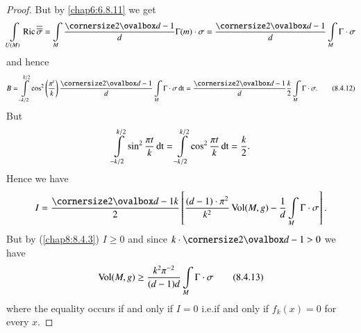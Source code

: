 \begin{proof}
But by \eqref{chap6:6.8.11} we get
$$
\int\limits_{U(M)}\Ric\oob{\sigma}=\int\limits_{M}\frac{\oval{d-1}}{d}\Gamma(m)\cdot
\sigma=\frac{\oval{d-1}}{d}\int\limits_{M}\Gamma\cdot \sigma
$$
and hence
\begin{equation*}
B=\int\limits^{k/2}_{-k/2}\cos^{2}\left(\frac{\pi^{t}}{k}\right)\frac{\oval{d-1}}{d}\int\limits_{M}\Gamma\cdot
\sigma \dt=
\frac{\oval{d-1}}{d}\frac{k}{2}\int\limits_{M}\Gamma\cdot\sigma.\tag{8.4.12}\label{chap8:8.4.12} 
\end{equation*}
But
$$
\int\limits^{k/2}_{-k/2}\sin^{2}\frac{\pi
  t}{k}\operatorname{dt}=\int\limits^{k/2}_{-k/2}\cos^{2}\frac{\pi t}{k}\operatorname{dt}=\frac{k}{2}. 
$$
Hence \pageoriginale we have
$$
I=\frac{\oval{d-1}k}{2}\left[\frac{(d-1)\cdot\pi^{2}}{k^{2}}\Vol(M,g)-\frac{1}{d}\int\limits_{M}\Gamma\cdot\sigma\right].
$$
But by (\ref{chap8:8.4.3}) $I\geq 0$ and since $k\cdot \oval{d-1}>0$ we
have
\begin{equation*}
\operatorname{Vol}(M,g)\geq
\frac{k^{2}\pi^{-2}}{(d-1)d}\int\limits_{M}\Gamma\cdot\sigma\tag{8.4.13}\label{chap8:8.4.13} 
\end{equation*}
where the equality occurs if and only if $I=0$ i.e.\@ if and only if
$f_{k}(x)=0$ for every $x$.


\end{proof}

